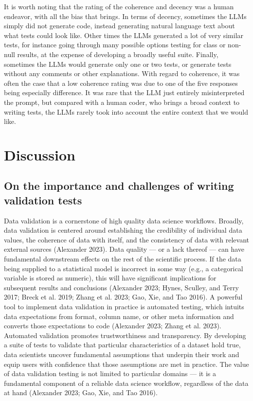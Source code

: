 \documentclass[
  letterpaper,
  DIV=11,
  numbers=noendperiod]{scrartcl}
\begin{document}
It is worth noting that the rating of the coherence and decency was a
human endeavor, with all the bias that brings. In terms of decency,
sometimes the LLMs simply did not generate code, instead generating
natural language text about what tests could look like. Other times the
LLMs generated a lot of very similar tests, for instance going through
many possible options testing for class or non-null results, at the
expense of developing a broadly useful suite. Finally, sometimes the
LLMs would generate only one or two tests, or generate tests without any
comments or other explanations. With regard to coherence, it was often
the case that a low coherence rating was due to one of the five
responses being especially difference. It was rare that the LLM just
entirely misinterpreted the prompt, but compared with a human coder, who
brings a broad context to writing tests, the LLMs rarely took into
account the entire context that we would like.

\hypertarget{sec-discussion}{%
\section{Discussion}\label{sec-discussion}}

\hypertarget{on-the-importance-and-challenges-of-writing-validation-tests}{%
\subsection{On the importance and challenges of writing validation
tests}\label{on-the-importance-and-challenges-of-writing-validation-tests}}

Data validation is a cornerstone of high quality data science workflows.
Broadly, data validation is centered around establishing the credibility
of individual data values, the coherence of data with itself, and the
consistency of data with relevant external sources (Alexander 2023).
Data quality --- or a lack thereof --- can have fundamental downstream
effects on the rest of the scientific process. If the data being
supplied to a statistical model is incorrect in some way (e.g., a
categorical variable is stored as numeric), this will have significant
implications for subsequent results and conclusions (Alexander 2023;
Hynes, Sculley, and Terry 2017; Breck et al. 2019; Zhang et al. 2023;
Gao, Xie, and Tao 2016). A powerful tool to implement data validation in
practice is automated testing, which intuits data expectations from
format, column name, or other meta information and converts those
expectations to code (Alexander 2023; Zhang et al. 2023). Automated
validation promotes trustworthiness and transparency. By developing a
suite of tests to validate that particular characteristics of a dataset
hold true, data scientists uncover fundamental assumptions that underpin
their work and equip users with confidence that those assumptions are
met in practice. The value of data validation testing is not limited to
particular domains --- it is a fundamental component of a reliable data
science workflow, regardless of the data at hand (Alexander 2023; Gao,
Xie, and Tao 2016).
\end{document}
